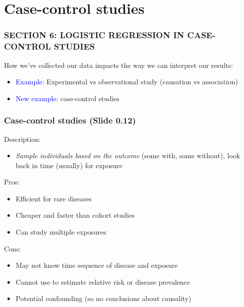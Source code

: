 \documentclass[12pt, 
hyperref={colorlinks=true, linkcolor=blue, urlcolor=cyan}]{beamer}
\begin{document}
\section{Case-control studies}
\begin{frame}
\frametitle{SECTION 6: LOGISTIC REGRESSION IN CASE-CONTROL STUDIES}

How we've collected our data impacts the way we can interpret our results:

\begin{itemize}
\item \textcolor{blue}{Example:} Experimental vs observational study (causation vs association)
\item \textcolor{blue}{New example:} case-control studies
\end{itemize}

\end{frame}


\begin{frame}
\frametitle{Case-control studies (Slide 0.12)}
Description: \vspace{-0.3cm}
\begin{itemize}
\item \textit{Sample individuals based on the outcome} (some with, some without), look back in time (usually) for exposure %
\end{itemize}

Pros:\vspace{-0.3cm}
\begin{itemize}
\item Efficient for rare diseases %
\item Cheaper and faster than cohort studies
\item Can study multiple exposures
\end{itemize}

Cons:\vspace{-0.3cm}
\begin{itemize}
\item May not know time sequence of disease and exposure
\item Cannot use to estimate relative risk or disease prevalence
\item Potential confounding (so no conclusions about causality)
\end{itemize}
\end{frame}
\end{document}
